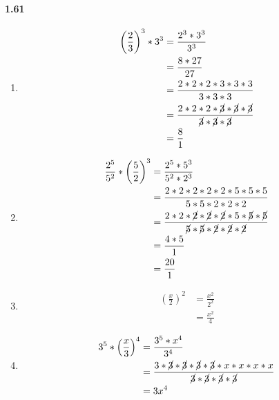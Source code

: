 \documentclass{article}
\newcommand\litem[1]{\item{\bfseries#1\space}}
\begin{document}
\paragraph{1.61}
\begin{enumerate}[label=\emph{\alph*})]
\litem{
\begin{align*}
  \left(\frac{2}{3}\right)^3 * 3^3 &= \frac{2^3 * 3^3}{3^3} \\
  &= \frac{8 * 27}{27} \\
  &= \frac{2 * 2 * 2 * 3 * 3 * 3}{3 * 3 * 3} \\ 
  &= \frac{2 * 2 * 2 * \cancel{3} * \cancel{3} * \cancel{3}}{\cancel{3} * \cancel{3} * \cancel{3}} \\
  &= \frac{8}{1}
\end{align*}
}
\litem{
\begin{align*}
  \frac{2^5}{5^2} * \left(\frac{5}{2}\right)^3 &= \frac{2^5 * 5^3}{5^2 * 2^3} \\
  &= \frac{2 * 2 * 2 * 2 * 2 * 5 * 5 * 5}{5 * 5 * 2 * 2 * 2} \\
  &= \frac{2 * 2 * \cancel{2} * \cancel{2} * \cancel{2} * 5 * \cancel{5} * \cancel{5}}{\cancel{5} * \cancel{5} * \cancel{2} * \cancel{2} * \cancel{2}} \\
  &= \frac{4 * 5}{1} \\
  &= \frac{20}{1}
\end{align*}
}
\litem{
\begin{align*}
  \left(\frac{x}{2}\right)^2 &= \frac{x^2}{2^2} \\
  &= \frac{x^2}{4}
\end{align*}
}
\litem{
\begin{align*}
  3^5 * \left(\frac{x}{3}\right)^4 &= \frac{3^5 * x^4}{3^4} \\
  &= \frac{3 * \cancel{3} * \cancel{3} * \cancel{3} * \cancel{3} * x * x * x * x}{\cancel{3} * \cancel{3} * \cancel{3} * \cancel{3}} \\
  &= 3x^4
\end{align*}
}
\end{enumerate}
\end{document}
